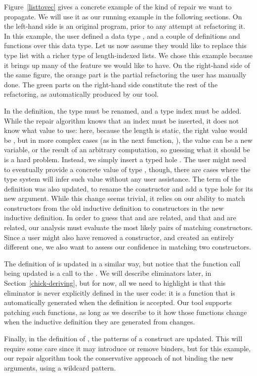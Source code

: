Figure~\ref{listtovec} gives a concrete example of the kind of repair we want to
propagate.  We will use it as our running example in the following sections.  On
the left-hand side is an original program, prior to any attempt at refactoring
it.  In this example, the user defined a data type , and a
couple of definitions and functions over this data type.  Let us now assume they
would like to replace this type list with a richer type of length-indexed lists.
We chose this example because it brings up many of the feature we would like to
have.  On the right-hand side of the same figure, the orange part is the partial
refactoring the user has manually done.  The green parts on the right-hand side
constitute the rest of the refactoring, as automatically produced by our tool.

In the  definition, the type must be renamed, and a type index
must be added.  While the repair algorithm knows that an index must be inserted,
it does not know what value to use: here, because the length is static, the
right value would be , but in more complex cases (as in the next
function, ), the value can be a new variable, or the result of
an arbitrary computation, so guessing what it should be is a hard problem.
Instead, we simply insert a typed hole .  The user might
need to eventually provide a concrete value of type , though,
there are cases where the type system will infer such value without any user
assistance.  The term of the definition was also updated, to rename the
constructor and add a type hole for its new argument.  While this change seems
trivial, it relies on our ability to match constructors from the old inductive
definition to constructors in the new inductive definition.  In order to guess
that  and  are related, and that 
and  are related, our analysis must evaluate the most likely
pairs of matching constructors.  Since a user might also have removed a
constructor, and created an entirely different one, we also want to assess our
confidence in matching two constructors.

The definition of  is updated in a similar way, but notice
that the function call being updated is a call to the 
.  We will describe eliminators later, in
Section~\ref{chick-deriving}, but for now, all we need to highlight is that this
eliminator is never explicitly defined in the user code: it is a function that
is automatically generated when the  definition is accepted.  Our
tool supports patching such functions, as long as we describe to it how those
functions change when the inductive definition they are generated from changes.

Finally, in the definition of , the patterns of a
 construct are updated.  This will require some care since it
may introduce or remove binders, but for this example, our repair algorithm took
the conservative approach of not binding the new arguments, using a wildcard
\coqinline{_} pattern.
